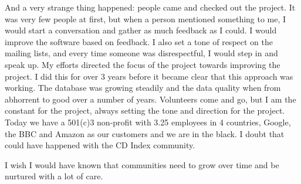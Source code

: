 And a very strange thing happened: people came and checked out the project. It was very few people at first, but when a person mentioned something to me, I would start a conversation and gather as much feedback as I could. I would improve the software based on feedback. I also set a tone of respect on the mailing lists, and every time someone was disrespectful, I would step in and speak up. My efforts directed the focus of the project towards improving the project. I did this for over 3 years before it became clear that this approach was working. The database was growing steadily and the data quality when from abhorrent to good over a number of years.  Volunteers come and go, but I am the constant for the project, always setting the tone and direction for the project. Today we have a 501(c)3 non-profit with 3.25 employees in 4 countries, Google, the BBC and Amazon as our customers and we are in the black. I doubt that could have happened with the CD Index community.

I wish I would have known that communities need to grow over time and be nurtured with a lot of care.
